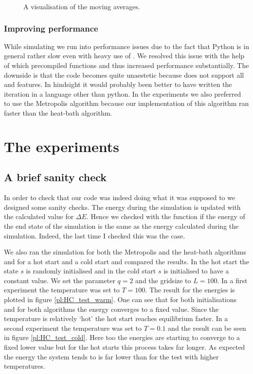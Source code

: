\begin{figure}
\centering

\caption{A visualisation of the moving averages.}
\label{fi:movingAverages}
\end{figure}

\subsubsection{Improving performance}

While simulating we run into performance issues due to the fact that Python is in general rather slow even with heavy use of . We resolved this issue with the help of  which precompiled functions and thus increased performance substantially. The downside is that the code becomes quite unaestetic because  does not support all  and  features. In hindsight it would probably been better to have written the iteration in a language other than python.
In the experiments we also preferred to use the Metropolis algorithm because our implementation of this algorithm ran faster than the heat-bath algorithm.

\section{The experiments}

\subsection{A brief sanity check}

In order to check that our code was indeed doing what it was supposed to we designed some sanity checks. 
The energy during the simulation is updated with the calculated value for $\Delta E$.
Hence we checked with the function  if the energy of the end state of the simulation is the same as the energy calculated during the simulation. Indeed, the last time I checked this was the case.

We also ran the simulation for both the Metropolis and the heat-bath algorithms and for a hot start and a cold start and compared the results. In the hot start the state $s$ is randomly initialised and in the cold start $s$ is initialised to have a constant value. We set the parameter $q=2$ and the gridsize to $L=100$. In a first experiment the temperature was set to $T=100$. The result for the energies is plotted in figure \ref{pl:HC_test_warm}. One can see that for both initialisations and for both algorithms the energy converges to a fixed value. Since the temperature is relatively `hot' the hot start reaches equilibrium faster. In a second experiment the temperature was set to $T=0.1$ and the result can be seen in figure \ref{pl:HC_test_cold}. Here too the energies are starting to converge to a fixed lower value but for the hot starts this process takes far longer. As expected the energy the system tends to is far lower than for the test with higher temperatures. 


